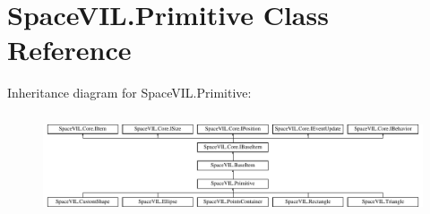 \hypertarget{class_space_v_i_l_1_1_primitive}{}\section{Space\+V\+I\+L.\+Primitive Class Reference}
\label{class_space_v_i_l_1_1_primitive}
Inheritance diagram for Space\+V\+I\+L.\+Primitive\+:\begin{figure}[H]
\begin{center}
\leavevmode
\includegraphics[height=3.027027cm]{class_space_v_i_l_1_1_primitive}
\end{center}
\end{figure}
